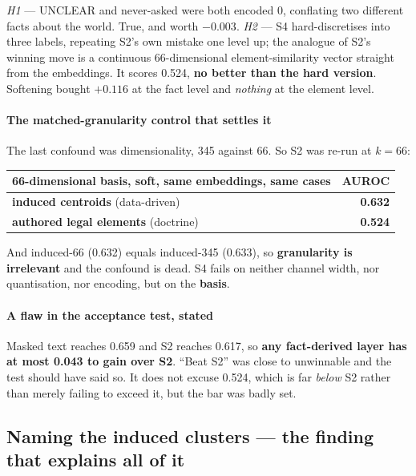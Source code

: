 \documentclass[12pt,a4paper]{article}
\begin{document}
\emph{H1} --- UNCLEAR and never-asked were both encoded 0, conflating two different facts about the
world. True, and worth $-0.003$. \emph{H2} --- S4 hard-discretises into three labels, repeating S2's
own mistake one level up; the analogue of S2's winning move is a continuous 66-dimensional
element-similarity vector straight from the embeddings. It scores 0.524, \textbf{no better than the
hard version}. Softening bought $+0.116$ at the fact level and \emph{nothing} at the element level.

\paragraph{The matched-granularity control that settles it} The last confound was dimensionality, 345
against 66. So S2 was re-run at $k=66$:

\begin{center}
\begin{tabular}{@{}lr@{}}
\toprule
\textbf{66-dimensional basis, soft, same embeddings, same cases} & \textbf{AUROC} \\
\midrule
\textbf{induced centroids} (data-driven) & \textbf{0.632} \\
\textbf{authored legal elements} (doctrine) & \textbf{0.524} \\
\bottomrule
\end{tabular}
\end{center}

And induced-66 (0.632) equals induced-345 (0.633), so \textbf{granularity is irrelevant} and the
confound is dead. S4 fails on neither channel width, nor quantisation, nor encoding, but on the
\textbf{basis}.

\paragraph{A flaw in the acceptance test, stated} Masked text reaches 0.659 and S2 reaches 0.617, so
\textbf{any fact-derived layer has at most 0.043 to gain over S2}. ``Beat S2'' was close to
unwinnable and the test should have said so. It does not excuse 0.524, which is far \emph{below} S2
rather than merely failing to exceed it, but the bar was badly set.

\subsection{Naming the induced clusters --- the finding that explains all of it}\label{sec:names}
\end{document}
